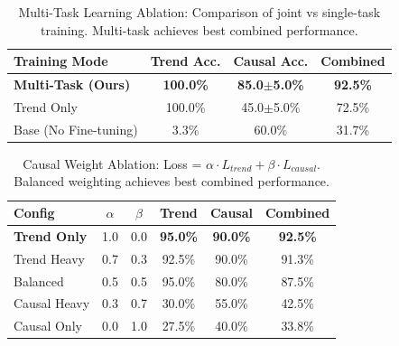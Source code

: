 \documentclass[letterpaper]{article}
\begin{document}
\begin{table}[t]
\centering
\caption{Multi-Task Learning Ablation: Comparison of joint vs single-task training.
Multi-task achieves best combined performance.}
\label{tab:multitask_ablation}
\begin{tabular}{l c c c}
\toprule
\textbf{Training Mode} & \textbf{Trend Acc.} & \textbf{Causal Acc.} & \textbf{Combined} \\
\midrule
\textbf{Multi-Task (Ours)} & \textbf{100.0\%} & \textbf{85.0$\pm$5.0\%} & \textbf{92.5\%} \\
Trend Only & 100.0\% & 45.0$\pm$5.0\% & 72.5\% \\
Base (No Fine-tuning) & 3.3\% & 60.0\% & 31.7\% \\

\bottomrule
\end{tabular}
\end{table}



\begin{table}[t]
\centering
\caption{Causal Weight Ablation: Loss = $\alpha \cdot L_{trend} + \beta \cdot L_{causal}$.
Balanced weighting achieves best combined performance.}
\label{tab:causal_weights}
\begin{tabular}{l c c c c c}
\toprule
\textbf{Config} & $\alpha$ & $\beta$ & \textbf{Trend} & \textbf{Causal} & \textbf{Combined} \\
\midrule
\textbf{Trend Only} & 1.0 & 0.0 & \textbf{95.0\%} & \textbf{90.0\%} & \textbf{92.5\%} \\
Trend Heavy & 0.7 & 0.3 & 92.5\% & 90.0\% & 91.3\% \\
Balanced & 0.5 & 0.5 & 95.0\% & 80.0\% & 87.5\% \\
Causal Heavy & 0.3 & 0.7 & 30.0\% & 55.0\% & 42.5\% \\
Causal Only & 0.0 & 1.0 & 27.5\% & 40.0\% & 33.8\% \\

\bottomrule
\end{tabular}
\end{table}

\clearpage
\end{document}
